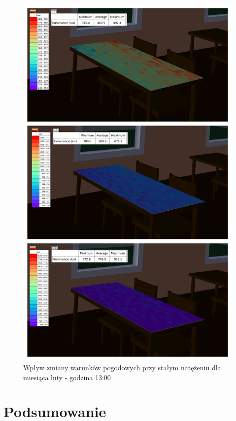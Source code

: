 \documentclass[a4paper,12pt]{article}
\begin{document}
	\begin{figure}[!th]
		\includegraphics[scale=0.8]{wplyw_warunkow_pogodowych}
		\centering
		\caption{Wpływ zmiany warunków pogodowych przy stałym natężeniu dla miesiąca luty - godzina 13:00}
		\label{fig:wplyw_warunkow_pogodowych_symulacja}
	\end{figure}
	\clearpage	
	
	\section{Podsumowanie}
	\label{sec:podsumowanie}	
\end{document}
